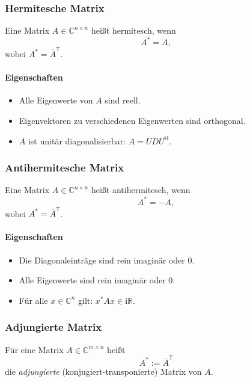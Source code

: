 \documentclass[9pt,a4paper]{article}
\begin{document}
    \subsubsection*{Hermitesche Matrix}
    
    Eine Matrix $A \in \mathbb{C}^{n\times n}$ heißt hermitesch, wenn
    \[
    A^{\mathsf *} = A,
    \]
    wobei $A^{\mathsf *} = \overline{A}^{\mathsf T}$.
    
    \paragraph{Eigenschaften}
    \begin{itemize}
        \item Alle Eigenwerte von $A$ sind reell.
        \item Eigenvektoren zu verschiedenen Eigenwerten sind orthogonal.
        \item $A$ ist unitär diagonalisierbar: $A = U D U^{\mathsf H}$.
    \end{itemize}
    
    \subsubsection*{Antihermitesche Matrix}
    
    Eine Matrix $A \in \mathbb{C}^{n\times n}$ heißt antihermitesch, wenn
    \[
    A^{\mathsf *} = -A,
    \]
    wobei $A^{\mathsf *} = \overline{A}^{\mathsf T}$.
    
    \paragraph*{Eigenschaften}
    \begin{itemize}
        \item Die Diagonaleinträge sind rein imaginär oder $0$.
        \item Alle Eigenwerte sind rein imaginär oder $0$.
        \item Für alle $x \in \mathbb{C}^n$ gilt: $x^{\mathsf *} A x \in \mathrm{i}\mathbb{R}$.
    \end{itemize}
    
    \subsubsection*{Adjungierte Matrix}
    
    Für eine Matrix $A \in \mathbb{C}^{m\times n}$ heißt
    \[
    A^{\mathsf *} := \overline{A}^{\mathsf T}
    \]
    die \emph{adjungierte} (konjugiert-transponierte) Matrix von $A$.
    
\end{document}
